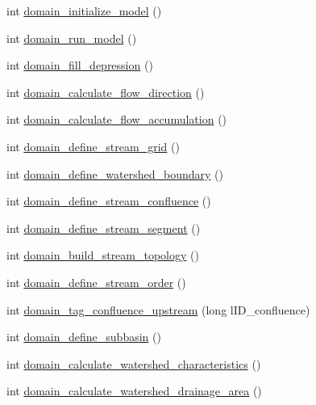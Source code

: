 \begin{DoxyCompactItemize}
\item 
int \hyperlink{classhexwatershed_1_1domain_a027b4dc68624df0ea9b479902fa37ec7}{domain\-\_\-initialize\-\_\-model} ()
\item 
int \hyperlink{classhexwatershed_1_1domain_a77dc83d7a361f08669141a6d30d2d9e6}{domain\-\_\-run\-\_\-model} ()
\item 
int \hyperlink{classhexwatershed_1_1domain_ac9e6620a2104e5852af9d420b206fea1}{domain\-\_\-fill\-\_\-depression} ()
\item 
int \hyperlink{classhexwatershed_1_1domain_a0deb61a5834c6dc73ea5257f9da4fed9}{domain\-\_\-calculate\-\_\-flow\-\_\-direction} ()
\item 
int \hyperlink{classhexwatershed_1_1domain_ae42abc180d3ee0b13b10389be5bc1719}{domain\-\_\-calculate\-\_\-flow\-\_\-accumulation} ()
\item 
int \hyperlink{classhexwatershed_1_1domain_a204f9552b66b2f2c94c32b50a99324eb}{domain\-\_\-define\-\_\-stream\-\_\-grid} ()
\item 
int \hyperlink{classhexwatershed_1_1domain_a1c8425f7efe360857994d6a70d080c97}{domain\-\_\-define\-\_\-watershed\-\_\-boundary} ()
\item 
int \hyperlink{classhexwatershed_1_1domain_af745bbbe6eff842e26996f43607fd36b}{domain\-\_\-define\-\_\-stream\-\_\-confluence} ()
\item 
int \hyperlink{classhexwatershed_1_1domain_a5aa4c948b2e6af271b961184522a114d}{domain\-\_\-define\-\_\-stream\-\_\-segment} ()
\item 
int \hyperlink{classhexwatershed_1_1domain_ad2b11812ce5315cdf3e7442a15c7fbaf}{domain\-\_\-build\-\_\-stream\-\_\-topology} ()
\item 
int \hyperlink{classhexwatershed_1_1domain_aaf3528852f5431fb674b94c6ce39dd5f}{domain\-\_\-define\-\_\-stream\-\_\-order} ()
\item 
int \hyperlink{classhexwatershed_1_1domain_a75316b0c2fea060db74db70c76d61711}{domain\-\_\-tag\-\_\-confluence\-\_\-upstream} (long l\-I\-D\-\_\-confluence)
\item 
int \hyperlink{classhexwatershed_1_1domain_afe910ab221c8e6871ae7e1d67e8788e1}{domain\-\_\-define\-\_\-subbasin} ()
\item 
int \hyperlink{classhexwatershed_1_1domain_aa1226d5aabd18a3f8edee1d086375270}{domain\-\_\-calculate\-\_\-watershed\-\_\-characteristics} ()
\item 
int \hyperlink{classhexwatershed_1_1domain_ad0460cce308bf46b551a28fb11d34391}{domain\-\_\-calculate\-\_\-watershed\-\_\-drainage\-\_\-area} ()

\end{DoxyCompactItemize}
